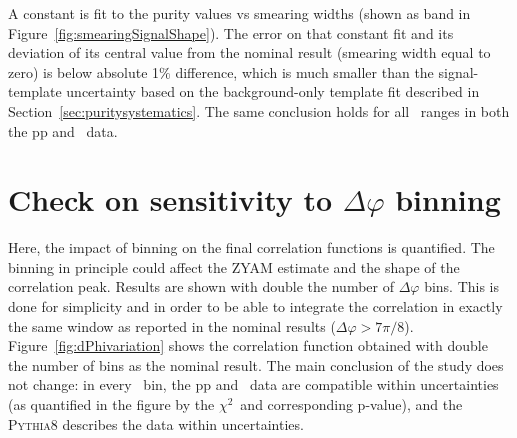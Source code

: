 A constant is fit to the purity values vs smearing widths (shown as band in Figure~\ref{fig:smearingSignalShape}). The error on that constant fit and its deviation of its central value from the nominal result (smearing width equal to zero) is below absolute 1$\%$ difference, which is much smaller than the signal-template uncertainty based on the background-only template fit described in Section~\ref{sec:puritysystematics}. The same conclusion holds for all \pt~ranges in both the pp and \pPb~data.  


\section{Check on sensitivity to $\Delta\varphi$ binning}

Here, the impact of binning on the final correlation functions is quantified. The binning in principle could affect the ZYAM estimate and the shape of the correlation peak. Results are shown with double the number of $\Delta\varphi$ bins. This is done for simplicity and in order to be able to integrate the correlation in exactly the same window as reported in the nominal results ($\Delta\varphi>7\pi/8$). Figure~\ref{fig:dPhivariation} shows the correlation function obtained with double the number of bins as the nominal result. The main conclusion of the study does not change: in every \zt~bin, the pp and \pPb~data are compatible within uncertainties (as quantified in the figure by the $\chi^{2}$~and corresponding p-value), and the \textsc{Pythia8} describes the data within uncertainties. 

